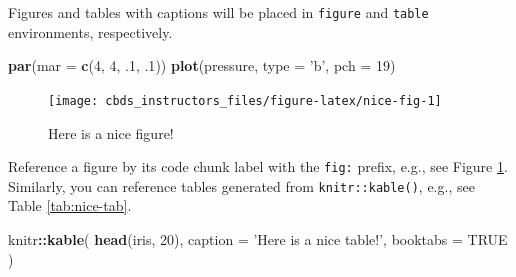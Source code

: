 \documentclass[]{book}
\newenvironment{Shaded}{\begin{snugshade}}{\end{snugshade}}
\newcommand{\DataTypeTok}[1]{\textcolor[rgb]{0.13,0.29,0.53}{#1}}
\newcommand{\DecValTok}[1]{\textcolor[rgb]{0.00,0.00,0.81}{#1}}
\newcommand{\FloatTok}[1]{\textcolor[rgb]{0.00,0.00,0.81}{#1}}
\newcommand{\KeywordTok}[1]{\textcolor[rgb]{0.13,0.29,0.53}{\textbf{#1}}}
\newcommand{\NormalTok}[1]{#1}
\newcommand{\OperatorTok}[1]{\textcolor[rgb]{0.81,0.36,0.00}{\textbf{#1}}}
\newcommand{\OtherTok}[1]{\textcolor[rgb]{0.56,0.35,0.01}{#1}}
\newcommand{\StringTok}[1]{\textcolor[rgb]{0.31,0.60,0.02}{#1}}
\begin{document}
Figures and tables with captions will be placed in \texttt{figure} and \texttt{table} environments, respectively.

\begin{Shaded}
\begin{Highlighting}[]
\KeywordTok{par}\NormalTok{(}\DataTypeTok{mar =} \KeywordTok{c}\NormalTok{(}\DecValTok{4}\NormalTok{, }\DecValTok{4}\NormalTok{, }\FloatTok{.1}\NormalTok{, }\FloatTok{.1}\NormalTok{))}
\KeywordTok{plot}\NormalTok{(pressure, }\DataTypeTok{type =} \StringTok{'b'}\NormalTok{, }\DataTypeTok{pch =} \DecValTok{19}\NormalTok{)}
\end{Highlighting}
\end{Shaded}

\begin{figure}

{\centering \texttt{[image: cbds\_instructors\_files/figure-latex/nice-fig-1]} 

}

\caption{Here is a nice figure!}\label{fig:nice-fig}
\end{figure}

Reference a figure by its code chunk label with the \texttt{fig:} prefix, e.g., see Figure \ref{fig:nice-fig}. Similarly, you can reference tables generated from \texttt{knitr::kable()}, e.g., see Table \ref{tab:nice-tab}.

\begin{Shaded}
\begin{Highlighting}[]
\NormalTok{knitr}\OperatorTok{::}\KeywordTok{kable}\NormalTok{(}
  \KeywordTok{head}\NormalTok{(iris, }\DecValTok{20}\NormalTok{), }\DataTypeTok{caption =} \StringTok{'Here is a nice table!'}\NormalTok{,}
  \DataTypeTok{booktabs =} \OtherTok{TRUE}
\NormalTok{)}
\end{Highlighting}
\end{Shaded}
\end{document}
